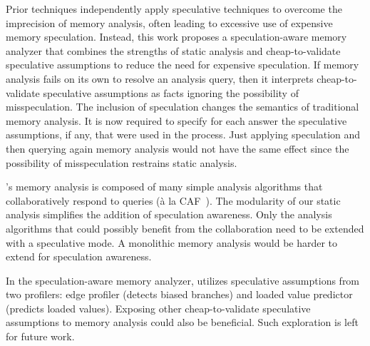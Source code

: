 %
Prior techniques independently apply speculative techniques to
overcome the imprecision of memory analysis, often leading to
excessive use of expensive memory speculation.
%
%
%
%
Instead, this work proposes a speculation-aware memory analyzer that
combines the strengths of static analysis and cheap-to-validate
speculative assumptions to reduce the need for expensive speculation.
If memory analysis fails on its own to resolve an analysis query, then
it interprets cheap-to-validate speculative assumptions as facts
ignoring the possibility of misspeculation.
%
The inclusion of speculation changes the semantics of traditional
memory analysis. It is now required to specify for each answer the
speculative assumptions, if any, that were used in the process.
%
Just applying speculation and then querying again memory analysis
would not have the same effect since the possibility of misspeculation
restrains static analysis.

%
%

\name's memory analysis is composed of many simple analysis algorithms
that collaboratively respond to queries (\`{a} la
CAF~\cite{johnson:cgo:17}).
%
The modularity of our static analysis simplifies the addition of
speculation awareness. Only the analysis algorithms that could
possibly benefit from the collaboration need to be extended with a
speculative mode.
%
A monolithic memory analysis would be harder to extend for speculation
awareness.

In the speculation-aware memory analyzer, \name utilizes speculative
assumptions from two profilers: edge profiler (detects biased
branches) and loaded value predictor (predicts loaded values).
%
Exposing other cheap-to-validate speculative assumptions to memory
analysis could also be beneficial.  Such exploration is left for
future work.

